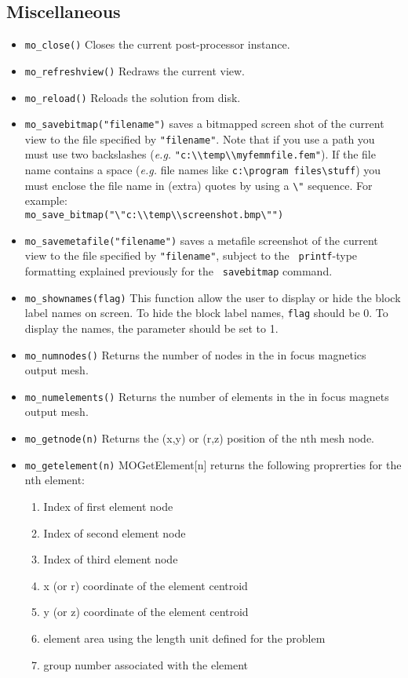 \subsection{Miscellaneous}
\begin{itemize}

\item{\tt mo\_close()} Closes the current post-processor instance.
\item{\tt mo\_refreshview()} Redraws the current view.
\item{\tt mo\_reload()} Reloads the solution from disk.
\item{\tt mo\_savebitmap("filename")} saves a bitmapped screen shot of the current
view to the file specified by {\tt "filename"}. Note that if you
use a path you must use two backslashes ({\em e.g.}
\verb+"c:\\temp\\myfemmfile.fem"+). If the file name contains a space
({\em e.g.} file names like \verb+c:\program files\stuff+) you must
enclose the file name in (extra) quotes by using a
\verb+\"+ sequence. For example:\\
 \verb+mo_save_bitmap("\"c:\\temp\\screenshot.bmp\"")+
\item{\tt mo\_savemetafile("filename")} saves a metafile screenshot of the current
view to the file specified by {\tt "filename"}, subject to the {\tt
printf}-type formatting explained previously for the {\tt
savebitmap} command.
\item{\tt mo\_shownames(flag)} This function allow the user to display or hide the block label
names on screen.  To hide the block label names, {\tt flag} should be 0.  To display the
names, the parameter should be set to 1.

\item{\tt mo\_numnodes()} Returns the number of nodes in the in focus magnetics output mesh.
\item{\tt mo\_numelements()} Returns the number of elements in the in focus magnets output mesh.
\item{\tt mo\_getnode(n)} Returns the (x,y) or (r,z) position of the nth mesh node.
\item{\tt mo\_getelement(n)} MOGetElement[n] returns the following proprerties for the nth element:
    \begin{enumerate}
        \item Index of first element node
        \item Index of second element node
        \item Index of third element node
        \item x (or r) coordinate of the element centroid
        \item y (or z) coordinate of the element centroid
        \item element area using the length unit defined for the problem
        \item group number associated with the element
    \end{enumerate}

\end{itemize}
